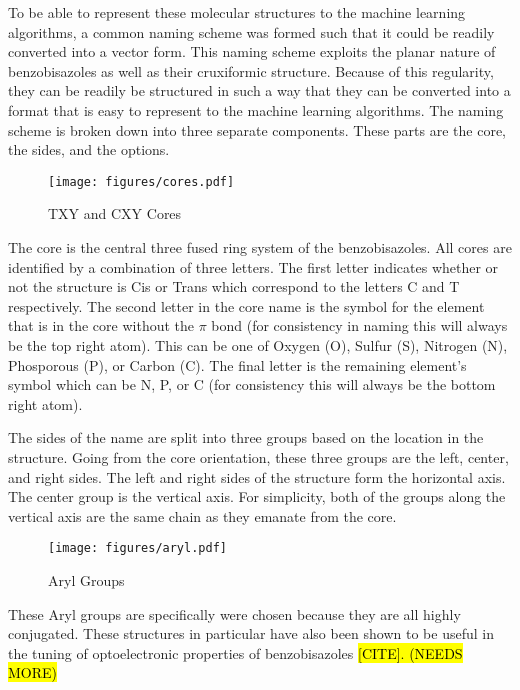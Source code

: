 \documentclass[10pt]{article}
\begin{document}
To be able to represent these molecular structures to the machine learning algorithms, a common naming scheme was formed such that it could be readily converted into a vector form. This naming scheme exploits the planar nature of benzobisazoles as well as their cruxiformic structure. Because of this regularity, they can be readily be structured in such a way that they can be converted into a format that is easy to represent to the machine learning algorithms. The naming scheme is broken down into three separate components. These parts are the core, the sides, and the options.

\begin{figure}[H]
  \begin{center}
    \texttt{[image: figures/cores.pdf]}
  \end{center}
  \caption{TXY and CXY Cores}
  \label{fig:cores}
\end{figure}

The core is the central three fused ring system of the benzobisazoles. All cores are identified by a combination of three letters. The first letter indicates whether or not the structure is Cis or Trans which correspond to the letters C and T respectively. The second letter in the core name is the symbol for the element that is in the core without the $\pi$ bond (for consistency in naming this will always be the top right atom). This can be one of Oxygen (O), Sulfur (S), Nitrogen (N), Phosporous (P), or Carbon (C). The final letter is the remaining element's symbol which can be N, P, or C (for consistency this will always be the bottom right atom).

The sides of the name are split into three groups based on the location in the structure. Going from the core orientation, these three groups are the left, center, and right sides. The left and right sides of the structure form the horizontal axis. The center group is the vertical axis. For simplicity, both of the groups along the vertical axis are the same chain as they emanate from the core.

\begin{figure}[H]
  \begin{center}
    \texttt{[image: figures/aryl.pdf]}
  \end{center}
  \caption{Aryl Groups}
  \label{fig:Aryl}
\end{figure}

These Aryl groups are specifically were chosen because they are all highly conjugated. These structures in particular have also been shown to be useful in the tuning of optoelectronic properties of benzobisazoles \hl{[CITE]. (NEEDS MORE)}
\end{document}
